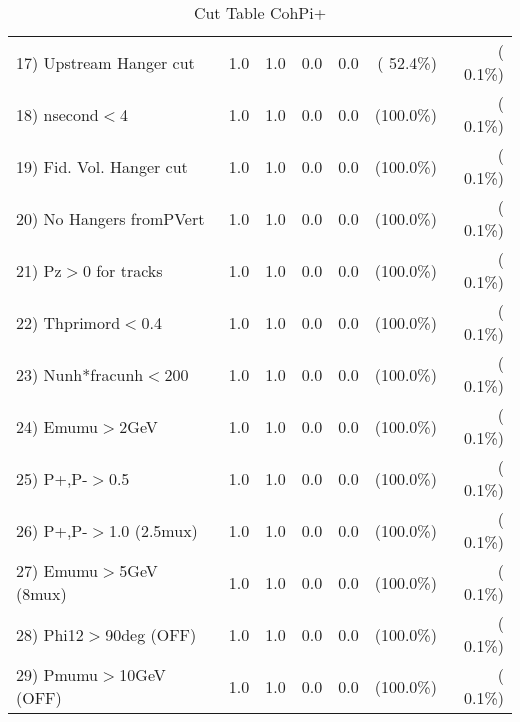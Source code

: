 \begin{table}[h!]
\begin{tabular}{||l||r|r|r|r|r|r||}
 17) Upstream Hanger cut  &          1.0 &          1.0 &          0.0 &          0.0 & ( 52.4\%) & (  0.1\%) \\
 18) nsecond$<$4          &          1.0 &          1.0 &          0.0 &          0.0 & (100.0\%) & (  0.1\%) \\
 19) Fid. Vol. Hanger cut &          1.0 &          1.0 &          0.0 &          0.0 & (100.0\%) & (  0.1\%) \\
 20) No Hangers fromPVert &          1.0 &          1.0 &          0.0 &          0.0 & (100.0\%) & (  0.1\%) \\
 21) Pz$>$0 for tracks    &          1.0 &          1.0 &          0.0 &          0.0 & (100.0\%) & (  0.1\%) \\
 22) Thprimord$<$0.4      &          1.0 &          1.0 &          0.0 &          0.0 & (100.0\%) & (  0.1\%) \\
 23) Nunh*fracunh$<$200   &          1.0 &          1.0 &          0.0 &          0.0 & (100.0\%) & (  0.1\%) \\
 24) Emumu$>$2GeV         &          1.0 &          1.0 &          0.0 &          0.0 & (100.0\%) & (  0.1\%) \\
 25) P+,P-$>$0.5          &          1.0 &          1.0 &          0.0 &          0.0 & (100.0\%) & (  0.1\%) \\
 26) P+,P-$>$1.0 (2.5mux) &          1.0 &          1.0 &          0.0 &          0.0 & (100.0\%) & (  0.1\%) \\
 27) Emumu$>$5GeV  (8mux) &          1.0 &          1.0 &          0.0 &          0.0 & (100.0\%) & (  0.1\%) \\
 28) Phi12$>$90deg  (OFF) &          1.0 &          1.0 &          0.0 &          0.0 & (100.0\%) & (  0.1\%) \\
 29) Pmumu$>$10GeV  (OFF) &          1.0 &          1.0 &          0.0 &          0.0 & (100.0\%) & (  0.1\%) \\
 \hline
 \hline
 \end{tabular}
 \caption{Cut Table  CohPi+   }
 \label{tab-cutcohjpsi-mumu_cohpip}
 \end{table}
